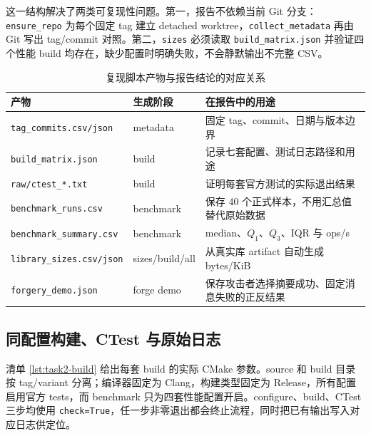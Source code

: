 \documentclass[11pt,a4paper,fontset=none]{ctexart}
\begin{document}
这一结构解决了两类可复现性问题。第一，报告不依赖当前 Git 分支：\texttt{ensure\_repo} 为每个固定 tag 建立 detached worktree，\texttt{collect\_metadata} 再由 Git 写出 tag/commit 对照。第二，\texttt{sizes} 必须读取 \texttt{build\_matrix.json} 并验证四个性能 build 均存在，缺少配置时明确失败，不会静默输出不完整 CSV。

\begin{table}[htbp]
\centering
\caption{复现脚本产物与报告结论的对应关系}
\label{tab:task2-artifacts}
\begin{tabular}{p{}p{}p{}}
\toprule
产物 & 生成阶段 & 在报告中的用途 \\
\midrule
\texttt{tag\_commits.csv/json} & metadata & 固定 tag、commit、日期与版本边界 \\
\texttt{build\_matrix.json} & build & 记录七套配置、测试日志路径和用途 \\
\texttt{raw/ctest\_*.txt} & build & 证明每套官方测试的实际退出结果 \\
\texttt{benchmark\_runs.csv} & benchmark & 保存 40 个正式样本，不用汇总值替代原始数据 \\
\texttt{benchmark\_summary.csv} & benchmark & median、$Q_1$、$Q_3$、IQR 与 ops/s \\
\texttt{library\_sizes.csv/json} & sizes/build/all & 从真实库 artifact 自动生成 bytes/KiB \\
\texttt{forgery\_demo.json} & forge demo & 保存攻击者选择摘要成功、固定消息失败的正反结果 \\
\bottomrule
\end{tabular}
\end{table}

\subsection{同配置构建、CTest 与原始日志}

清单 \ref{lst:task2-build} 给出每套 build 的实际 CMake 参数。source 和 build 目录按 tag/variant 分离；编译器固定为 Clang，构建类型固定为 Release，所有配置启用官方 tests，而 benchmark 只为四套性能配置开启。configure、build、CTest 三步均使用 \texttt{check=True}，任一步非零退出都会终止流程，同时把已有输出写入对应日志供定位。


\end{document}
